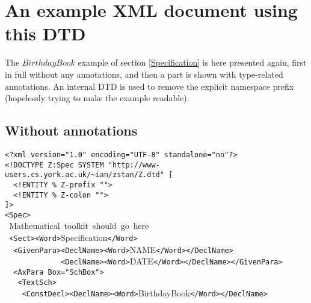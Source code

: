 \documentclass[a4paper,10pt]{article}
\begin{document}
\section{An example XML document using this DTD}

The $BirthdayBook$ example of section \ref{Specification}
is here presented again, first in full without any annotations,
and then a part is shown with type-related annotations.
An internal DTD is used to remove the explicit namespace prefix
(hopelessly trying to make the example readable).

\subsection{Without annotations}

\begin{zed}
\verb&<?xml version="1.0" encoding="UTF-8" standalone="no"?>&\\
\verb&<!DOCTYPE Z:Spec SYSTEM "http://www-users.cs.york.ac.uk/~ian/zstan/Z.dtd" [&\\
\verb&  <!ENTITY % Z-prefix "">&\\
\verb&  <!ENTITY % Z-colon "">&\\
\verb&]>&\\
\verb&<Spec>&\\
\verb& &Mathematical~toolkit~should~go~here\\
\verb& <Sect><Word>&Specification\verb&</Word>&\\
\verb&  <GivenPara><DeclName><Word>&NAME\verb&</Word></DeclName>&\\
\verb&             <DeclName><Word>&DATE\verb&</Word></DeclName></GivenPara>&\\
\verb&  <AxPara Box="SchBox">&\\
\verb&   <TextSch>&\\
\verb&    <ConstDecl><DeclName><Word>&BirthdayBook\verb&</Word></DeclName>&\\
\end{zed}
\end{document}
